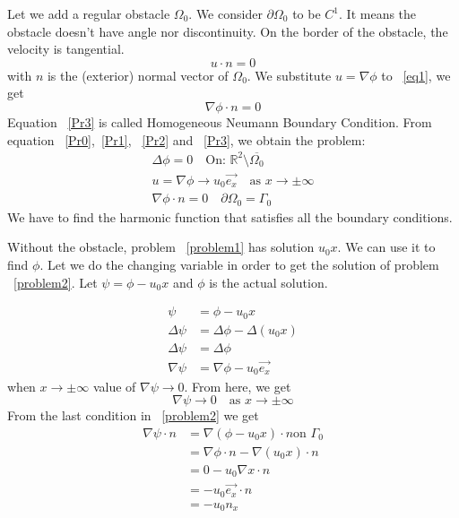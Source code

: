 \documentclass[a4paper,12pt]{article}
\begin{document}
Let we add a regular obstacle $\Omega_0$. We consider $\partial\Omega_0$ to be $C^1$. It means the obstacle doesn't have angle nor discontinuity. 
On the border of the obstacle, the velocity is tangential.
\begin{equation}\label{eq1}
u\cdot n=0
\end{equation}
with $n$ is the (exterior) normal vector of $\Omega_0$.
We substitute $u=\nabla\phi$ to ~\eqref{eq1}, we get 
\begin{equation}\label{Pr3}
\nabla\phi\cdot n=0
\end{equation}
Equation ~\eqref{Pr3} is called Homogeneous Neumann Boundary Condition.  
From equation ~\eqref{Pr0},~\eqref{Pr1}, ~\eqref{Pr2} and ~\eqref{Pr3}, we obtain the problem:
\begin{align} \label{problem2}
\Delta \phi=0 \quad \text{On: } \mathbb{R}^2 \setminus \overline{\Omega_0}\\
u=\nabla\phi\to u_0\vec{e_x}\quad \text{as } x \to \pm\infty\\
\nabla\phi \cdot n=0 \quad \partial \Omega_0=\Gamma_0
\end{align}
We have to find the harmonic function that satisfies all the boundary conditions.

Without the obstacle, problem ~\eqref{problem1} has solution $u_0x$. We can use it to find $\phi$. Let we do the changing variable in order to get the solution of problem ~\eqref{problem2}.
Let $\psi=\phi-u_0 x$ and $\phi$ is the actual solution. 

\begin{align}
\psi&=\phi-u_0 x\\
 \Delta \psi &= \Delta \phi-\Delta (u_0x)\\
\Delta \psi &= \Delta \phi\\
\nabla \psi &= \nabla\phi-u_0\vec{e_x}
\end{align}
when $x\to\pm\infty$ value of $\nabla \psi\to 0$.
From here, we get 
\begin{equation}
 \nabla\psi\to0 \quad \text{as } x\to\pm\infty
\end{equation}
From the last condition in ~\eqref{problem2} we get
\begin{align} 
 \nabla\psi\cdot n &= \nabla(\phi-u_0 x)\cdot n \text{on } \Gamma_0\\
&=\nabla\phi \cdot n - \nabla(u_0 x)\cdot n\\
&=0-u_0\nabla x\cdot n\\
&=-u_0 \vec{e_x} \cdot n\\
&=-u_0 n_x
\end{align}
\end{document}
